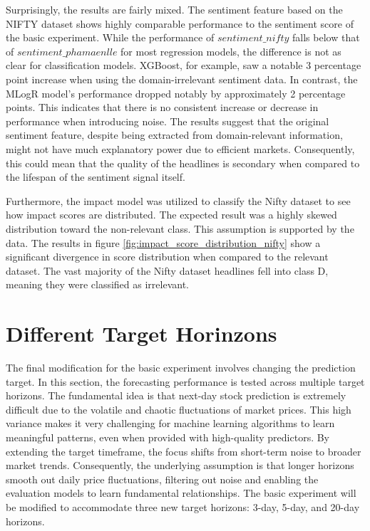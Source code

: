 \documentclass[Master,english,IEEE]{twbook}
\begin{document}
Surprisingly, the results are fairly mixed. The sentiment feature based on the NIFTY dataset shows highly comparable performance to the sentiment score of the basic experiment. While the performance of $sentiment\_nifty$ falls below that of $sentiment\_phamaenlle$ for most regression models, the difference is not as clear for classification models. XGBoost, for example, saw a notable 3 percentage point increase when using the domain-irrelevant sentiment data. In contrast, the MLogR model's performance dropped notably by approximately 2 percentage points. This indicates that there is no consistent increase or decrease in performance when introducing noise. The results suggest that the original sentiment feature, despite being extracted from domain-relevant information, might not have much explanatory power due to efficient markets. Consequently, this could mean that the quality of the headlines is secondary when compared to the lifespan of the sentiment signal itself.

Furthermore, the impact model was utilized to classify the Nifty dataset to see how impact scores are distributed. The expected result was a highly skewed distribution toward the non-relevant class. This assumption is supported by the data. The results in figure \ref{fig:impact_score_distribution_nifty} show a significant divergence in score distribution when compared to the relevant dataset. The vast majority of the Nifty dataset headlines fell into class D, meaning they were classified as irrelevant.

\section{Different Target Horinzons}
The final modification for the basic experiment involves changing the prediction target. In this section, the forecasting performance is tested across multiple target horizons. The fundamental idea is that next-day stock prediction is extremely difficult due to the volatile and chaotic fluctuations of market prices. This high variance makes it very challenging for machine learning algorithms to learn meaningful patterns, even when provided with high-quality predictors. By extending the target timeframe, the focus shifts from short-term noise to broader market trends. Consequently, the underlying assumption is that longer horizons smooth out daily price fluctuations, filtering out noise and enabling the evaluation models to learn fundamental relationships. The basic experiment will be modified to accommodate three new target horizons: 3-day, 5-day, and 20-day horizons.
\end{document}
